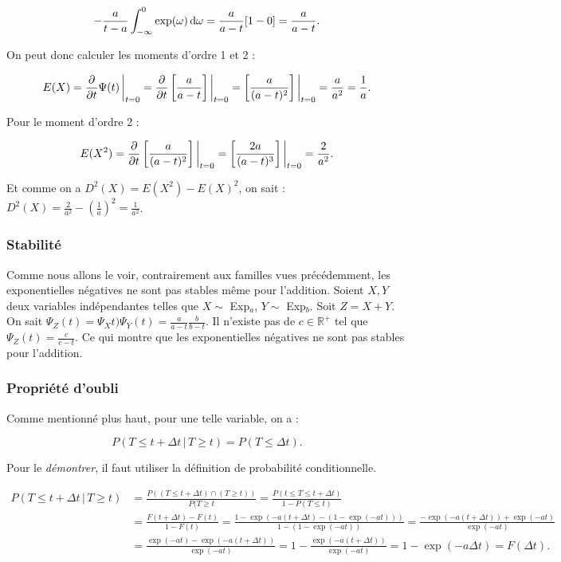 \documentclass{article}
\renewcommand{\pd}[1]{\frac {\partial}{\partial #1}}
\begin{document}
			\[-\frac a{t-a}\int_{-\infty}^0\exp(\omega)\dif\omega = \frac a{a-t}[1-0] = \frac a{a-t}.\]

			On peut donc calculer les moments d'ordre 1 et 2 :

			\[E(X) = \pd t\Psi(t)\sVert[3]_{t=0} = \pd t\left[\frac a{a-t}\right]\sVert[3]_{t=0} = \left[\frac a{(a-t)^2}\right]\sVert[3]_{t=0} = \frac a{a^2} = \frac 1a.\]

			Pour le moment d'ordre 2 :

			\[E(X^2) = \pd t\left[\frac a{(a-t)^2}\right]\sVert[3]_{t=0} = \left[\frac {2a}{(a-t)^3}\right]\sVert[3]_{t=0} = \frac 2{a^2}.\]

			Et comme on a $D^2(X) = E(X^2) - E(X)^2$, on sait : $D^2(X) = \frac 2{a^2} - \left(\frac 1a\right)^2 = \frac 1{a^2}$.

		\subsubsection{Stabilité}
			Comme nous allons le voir, contrairement aux familles vues précédemment, les exponentielles négatives ne sont pas stables même pour l'addition. Soient $X, Y$ deux
			variables indépendantes telles que $X \sim $ Exp$_a$, $Y \sim $ Exp$_b$. Soit $Z = X + Y$. On sait $\Psi_Z(t) = \Psi_Xt)\Psi_Y(t) = \frac a{a-t}\frac b{b-t}$.
			Il n'existe pas de $c \in \mathbb R^+$ tel que $\Psi_Z(t) = \frac c{c-t}$. Ce qui montre que les exponentielles négatives ne sont pas stables pour l'addition.

		\subsubsection{Propriété d'oubli}
			Comme mentionné plus haut, pour une telle variable, on a :

			\[P(T \leq t + \Delta t \, | \, T \geq t) = P(T \leq \Delta t).\]

			Pour le \textit{démontrer}, il faut utiliser la définition de probabilité conditionnelle.

			\[\begin{aligned}
				P(T \leq t + \Delta t \, | \, T \geq t) &= \frac {P((T \leq t + \Delta t) \cap (T \geq t))}{P(T \geq t} = \frac {P(t \leq T \leq t+\Delta t)}{1-P(T \leq t)} \\
				&= \frac {F(t+\Delta t) - F(t)}{1-F(t)} = \frac {1-\exp(-a(t+\Delta t) - (1-\exp(-at)))}{1-(1-\exp(-at))} = \frac {-\exp(-a(t+\Delta t)) + \exp(-at)}{\exp(-at)} \\
				&= \frac {\exp(-at) - \exp(-a(t+\Delta t))}{\exp(-at)} = 1 - \frac {\exp(-a(t+\Delta t))}{\exp(-at)} = 1 - \exp(-a\Delta t) = F(\Delta t).
			\end{aligned}\]
\end{document}
